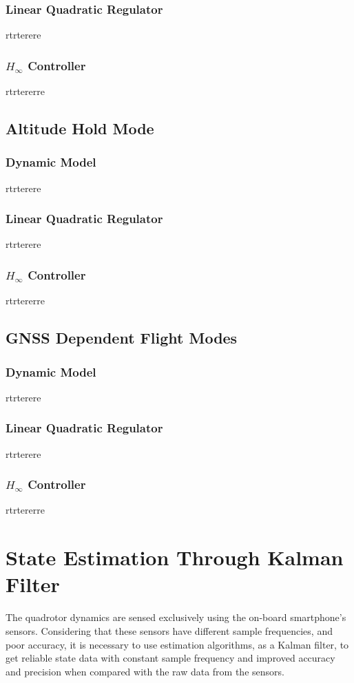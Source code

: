 \subsubsection{Linear Quadratic Regulator}
rtrterere

\subsubsection{$H_\infty$ Controller}
rtrtererre

\subsection{Altitude Hold Mode}
\subsubsection{Dynamic Model}
rtrterere
\subsubsection{Linear Quadratic Regulator}
rtrterere

\subsubsection{$H_\infty$ Controller}
rtrtererre

\subsection{GNSS Dependent Flight Modes}

\subsubsection{Dynamic Model}
rtrterere

\subsubsection{Linear Quadratic Regulator}
rtrterere

\subsubsection{$H_\infty$ Controller}
rtrtererre


\section{State Estimation Through Kalman Filter}
The quadrotor dynamics are sensed exclusively using the on-board smartphone's sensors. Considering that these sensors have different sample frequencies, and poor accuracy, it is necessary to use estimation algorithms, as a Kalman filter, to get reliable state data with constant sample frequency and improved accuracy and precision when compared with the raw data from the sensors.

